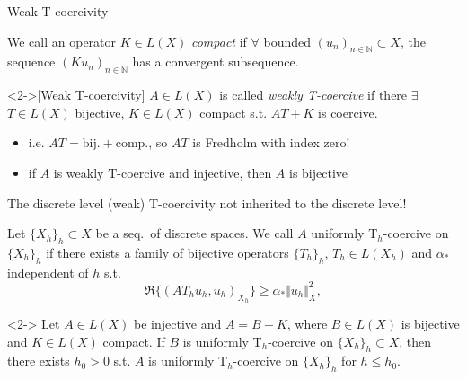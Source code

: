 \documentclass[11pt,aspectratio=169,xcolor=dvipsnames]{beamer}
\newcommand{\N}{\mathbb{N}}
\newcommand{\seq}[1]{(#1_n)_{n \in \N}}
\newcommand{\nicearrow}[2]{\raisebox{#2}{\resizebox{0.45cm}{!}{\color{#1}{\MVRightArrow}\color{black}}}}
\begin{document}
\begin{frame}{Weak T-coercivity}
    \begin{definition}
        We call an operator $K \in L(X)$ \emph{compact} if $\forall$ bounded $\seq{u} \subset X$, the sequence $\seq{K u}$ has a convergent subsequence.
    \end{definition}
    \begin{definition}<2->[Weak T-coercivity\footnotemark]
        $A \in L(X)$ is called \emph{weakly T-coercive} if there $\exists$ $T \in L(X)$ bijective, $K \in L(X)$ compact s.t. $AT + K$ is coercive.   
    \end{definition}
    \begin{itemize}
        \item<3->[\nicearrow{GOE}{-0.06cm}] i.e. $AT = \text{bij.} + \text{comp.}$, so $AT$ is Fredholm with index zero!
        \item<4->[\nicearrow{GOE}{-0.06cm}] if $A$ is weakly T-coercive and injective, then $A$ is bijective
    \end{itemize}
\end{frame}


\begin{frame}{The discrete level}
  \nicearrow{GOE}{-0.07cm} (weak) T-coercivity not inherited to the discrete level!
  \begin{definition}
    Let $\{ X_h \}_{h} \subset X$ be a seq.~of discrete spaces. We call $A$ uniformly T$_h$-coercive on $\{ X_h \}_h$ if there exists a family of bijective operators $\{ T_h \}_h$, $T_h \in L(X_h)$ and  $\alpha_{\ast}$ independent of $h$ s.t. 
    \begin{equation*}
      \Re \{ (A T_hu_h,u_h)_{X_h} \} \ge \alpha_{\ast} \Vert u_h \Vert_{X}^2,
    \end{equation*}
  \end{definition} 
  \begin{theorem}<2->
    Let $A \in L(X)$ be \alert{injective} and $A = B + K$, where $B \in L(X)$ is \alert{bijective} and $K \in L(X)$ \alert{compact}. If \alert{$B$ is uniformly T$_h$-coercive} on $\{X_h\}_h \subset X$, then there exists $h_0 > 0$ s.t. $A$ is uniformly T$_h$-coercive on $\{X_h\}_h$ for $h \le h_0$.
  \end{theorem}
\end{frame}
\end{document}
